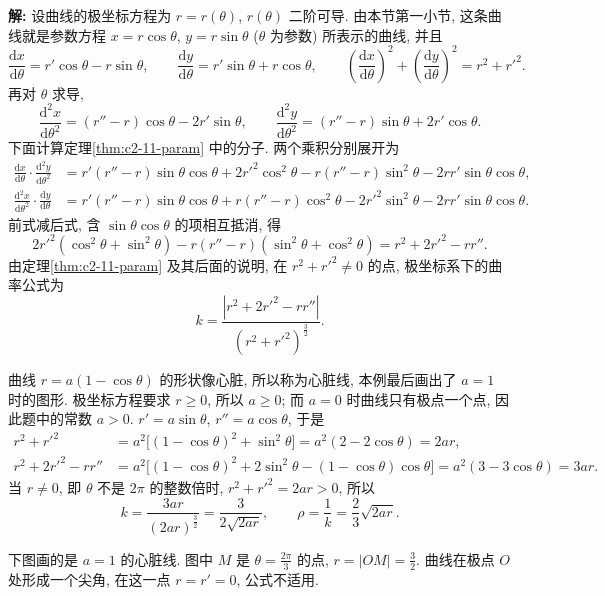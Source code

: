 \documentclass[UTF8,openany]{ctexbook}
\theoremstyle{chinesetextbook}
\newenvironment{cnsolution}{\par\indent\textbf{解:} \ignorespaces}{\par}
\newcommand{\dd}{\mathrm d}
\begin{document}
\begin{cnsolution}
设曲线的极坐标方程为 $r=r(\theta)$, $r(\theta)$ 二阶可导. 由本节第一小节, 这条曲线就是参数方程 $x=r\cos\theta$, $y=r\sin\theta$ ($\theta$ 为参数) 所表示的曲线, 并且
\[
\frac{\dd x}{\dd\theta}=r'\cos\theta-r\sin\theta,\qquad\frac{\dd y}{\dd\theta}=r'\sin\theta+r\cos\theta,\qquad\left(\frac{\dd x}{\dd\theta}\right)^2+\left(\frac{\dd y}{\dd\theta}\right)^2=r^2+r'^2.
\]
再对 $\theta$ 求导,
\[
\frac{\dd^2x}{\dd\theta^2}=(r''-r)\cos\theta-2r'\sin\theta,\qquad\frac{\dd^2y}{\dd\theta^2}=(r''-r)\sin\theta+2r'\cos\theta.
\]
下面计算定理\ref{thm:c2-11-param} 中的分子. 两个乘积分别展开为
\[
\begin{aligned}
\frac{\dd x}{\dd\theta}\cdot\frac{\dd^2y}{\dd\theta^2}&=r'(r''-r)\sin\theta\cos\theta+2r'^2\cos^2\theta-r(r''-r)\sin^2\theta-2rr'\sin\theta\cos\theta,\\
\frac{\dd^2x}{\dd\theta^2}\cdot\frac{\dd y}{\dd\theta}&=r'(r''-r)\sin\theta\cos\theta+r(r''-r)\cos^2\theta-2r'^2\sin^2\theta-2rr'\sin\theta\cos\theta.
\end{aligned}
\]
前式减后式, 含 $\sin\theta\cos\theta$ 的项相互抵消, 得
\[
2r'^2(\cos^2\theta+\sin^2\theta)-r(r''-r)(\sin^2\theta+\cos^2\theta)=r^2+2r'^2-rr''.
\]
由定理\ref{thm:c2-11-param} 及其后面的说明, 在 $r^2+r'^2\ne0$ 的点, 极坐标系下的曲率公式为
\[
k=\frac{|r^2+2r'^2-rr''|}{(r^2+r'^2)^{\frac32}}.
\]

曲线 $r=a(1-\cos\theta)$ 的形状像心脏, 所以称为心脏线, 本例最后画出了 $a=1$ 时的图形. 极坐标方程要求 $r\ge0$, 所以 $a\ge0$; 而 $a=0$ 时曲线只有极点一个点, 因此题中的常数 $a>0$. $r'=a\sin\theta$, $r''=a\cos\theta$, 于是
\[
\begin{aligned}
r^2+r'^2&=a^2\bigl[(1-\cos\theta)^2+\sin^2\theta\bigr]=a^2(2-2\cos\theta)=2ar,\\
r^2+2r'^2-rr''&=a^2\bigl[(1-\cos\theta)^2+2\sin^2\theta-(1-\cos\theta)\cos\theta\bigr]=a^2(3-3\cos\theta)=3ar.
\end{aligned}
\]
当 $r\ne0$, 即 $\theta$ 不是 $2\pi$ 的整数倍时, $r^2+r'^2=2ar>0$, 所以
\[
k=\frac{3ar}{(2ar)^{\frac32}}=\frac3{2\sqrt{2ar}},\qquad\rho=\frac1k=\frac23\sqrt{2ar}.
\]

下图画的是 $a=1$ 的心脏线. 图中 $M$ 是 $\displaystyle\theta=\frac{2\pi}3$ 的点, $\displaystyle r=|OM|=\frac32$. 曲线在极点 $O$ 处形成一个尖角, 在这一点 $r=r'=0$, 公式不适用.
\begin{center}
\end{center}
\end{cnsolution}
\end{document}
